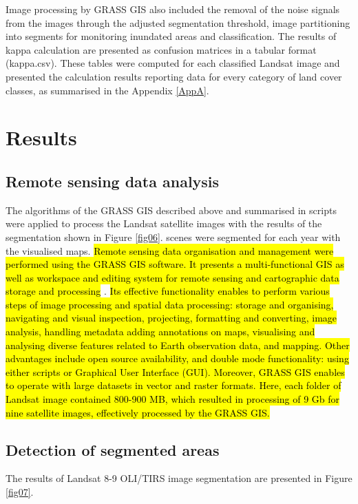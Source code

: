 \documentclass[analytics,article,submit,pdftex,moreauthors]{Definitions/mdpi}
\begin{document}
Image processing by GRASS GIS also included the removal of the noise signals from the images through the adjusted segmentation threshold, image partitioning into segments for monitoring inundated areas and classification. The results of kappa calculation are presented as confusion matrices in a tabular format (kappa.csv). These tables were computed for each classified Landsat image and presented the calculation results reporting data for every category of land cover classes, as summarised in the Appendix \ref{AppA}. 

\section{Results}

\subsection{Remote sensing data analysis}
The algorithms of the GRASS GIS described above and summarised in scripts were applied to process the Landsat satellite images with the results of the segmentation shown in Figure \ref{fig06}. scenes were segmented for each year with the visualised maps. \hl{Remote sensing data organisation and management were performed using the GRASS GIS software. It presents a multi-functional GIS as well as workspace and editing system for remote sensing and cartographic data storage and processing} \cite{NETELER2012124}. \hl{Its effective functionality enables to perform various steps of image processing and spatial data processing: storage and organising, navigating and visual inspection, projecting, formatting and converting, image analysis, handling metadata adding annotations on maps, visualising and analysing diverse features related to Earth observation data, and mapping. Other advantages include open source availability, and double mode functionality: using either scripts or Graphical User Interface (GUI). Moreover, GRASS GIS enables to operate with large datasets in vector and raster formats. Here, each folder of Landsat image contained 800-900 MB, which resulted in processing of 9 Gb for nine satellite images, effectively processed by the GRASS GIS. }

\subsection{Detection of segmented areas}

The results of Landsat 8-9 OLI/TIRS image segmentation are presented in Figure \ref{fig07}. 
\end{document}
